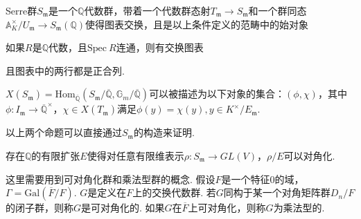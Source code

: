 \begin{cdef}
    Serre群$S_{\mathfrak{m}}$是一个$\mathbb{Q}$代数群，带着一个代数群态射$T_{\mathfrak{m}}\to S_{\mathfrak{m}}$和一个群同态$\mathbb{A}_K^{\times}/U_{\mathfrak{m}}\to S_{\mathfrak{m}}(\mathbb{Q})$使得图表交换，且是以上条件定义的范畴中的始对象
    \begin{figure}[H]
        \centering
    \end{figure}
\end{cdef}

\begin{cprop}
    如果$R$是$\mathbb{Q}$代数，且$\mathrm{Spec}\ R$连通，则有交换图表
    \begin{figure}[H]
        \centering
    \end{figure}
    且图表中的两行都是正合列.
\end{cprop}

\begin{cprop}
    $X(S_{\mathfrak{m}}) = \mathrm{Hom}_{\overline{\mathbb{Q}}}(S_{\mathfrak{m}}/\overline{\mathbb{Q}}, \mathbb{G}_{m}/\overline{\mathbb{Q}})$可以被描述为以下对象的集合：$(\phi, \chi)$，其中$\phi: I_{\mathfrak{m}}\to \overline{\mathbb{Q}}^{\times}$，$\chi\in X(T_{\mathfrak{m}})$满足$\phi(y) = \chi(y), y\in K^{\times}/ E_{\mathfrak{m}}$.
\end{cprop}

以上两个命题可以直接通过$S_{\mathfrak{m}}$的构造来证明.

\begin{cprop}
    存在$\mathbb{Q}$的有限扩张$E$使得对任意有限维表示$\rho:S_{\mathfrak{m}}\to GL(V)$，$\rho/E$可以对角化. \label{split_finite}
\end{cprop}

这里需要用到可对角化群和乘法型群的概念. 假设$F$是一个特征$0$的域，$\Gamma = \mathrm{Gal}(\overline{F}/F)$. $G$是定义在$F$上的交换代数群.
若$G$同构于某一个对角矩阵群$D_n/F$的闭子群，则称$G$是可对角化的. 如果$G$在$\overline{F}$上可对角化，则称$G$为乘法型的.

